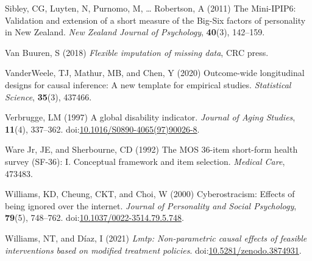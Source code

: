 \documentclass[
  singlecolumn,
  9pt]{article}
\newlength{\cslhangindent}
\newlength{\cslentryspacingunit} %
\newenvironment{CSLReferences}[2] %
 {%
  \setlength{\parindent}{0pt}
  \ifodd #1
  \let\oldpar\par
  \def\par{\hangindent=\cslhangindent\oldpar}
  \fi
  \setlength{\parskip}{#2\cslentryspacingunit}
 }%
 {}
\begin{document}
\begin{CSLReferences}{1}{0}
\leavevmode{}%
Sibley, CG, Luyten, N, Purnomo, M, \ldots{} Robertson, A (2011) The
Mini-IPIP6: Validation and extension of a short measure of the Big-Six
factors of personality in New Zealand. \emph{New Zealand Journal of
Psychology}, \textbf{40}(3), 142--159.

\leavevmode{}%
Van Buuren, S (2018) \emph{Flexible imputation of missing data}, CRC
press.

\leavevmode{}%
VanderWeele, TJ, Mathur, MB, and Chen, Y (2020) Outcome-wide
longitudinal designs for causal inference: A new template for empirical
studies. \emph{Statistical Science}, \textbf{35}(3), 437466.

\leavevmode{}%
Verbrugge, LM (1997) A global disability indicator. \emph{Journal of
Aging Studies}, \textbf{11}(4), 337--362.
doi:\href{https://doi.org/10.1016/S0890-4065(97)90026-8}{10.1016/S0890-4065(97)90026-8}.

\leavevmode{}%
Ware Jr, JE, and Sherbourne, CD (1992) The MOS 36-item short-form health
survey (SF-36): I. Conceptual framework and item selection.
\emph{Medical Care}, 473483.

\leavevmode{}%
Williams, KD, Cheung, CKT, and Choi, W (2000) Cyberostracism: Effects of
being ignored over the internet. \emph{Journal of Personality and Social
Psychology}, \textbf{79}(5), 748--762.
doi:\href{https://doi.org/10.1037/0022-3514.79.5.748}{10.1037/0022-3514.79.5.748}.

\leavevmode{}%
Williams, NT, and Díaz, I (2021) \emph{Lmtp: Non-parametric causal
effects of feasible interventions based on modified treatment policies}.
doi:\href{https://doi.org/10.5281/zenodo.3874931}{10.5281/zenodo.3874931}.

\end{CSLReferences}
\end{document}
